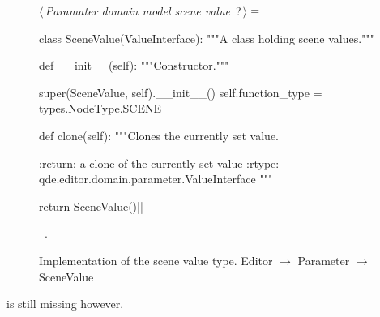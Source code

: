 \documentclass[%
    a4paper,    %
    justified,  %
    nobib,      %
    openany     %
]{tufte-book}
\begin{document}
\begin{figure}
\begin{flushleft} \small
\begin{minipage}{\linewidth}\label{scrap133}\raggedright\small
{} $\langle\,${\itshape Paramater domain model scene value}\nobreak\ {\footnotesize {?}}$\,\rangle\equiv$
\vspace{-1ex}
\begin{pythoncode}
class SceneValue(ValueInterface):
    """A class holding scene values."""

    def __init__(self):
        """Constructor."""

        super(SceneValue, self).__init__()
        self.function_type = types.NodeType.SCENE

    def clone(self):
        """Clones the currently set value.

        :return: a clone of the currently set value
        :rtype:  qde.editor.domain.parameter.ValueInterface
        """

        return SceneValue()|\NWsep|
\end{pythoncode}
\vspace{1.5ex}
\footnotesize
\begin{list}{}{\setlength{\itemsep}{-\parsep}\setlength{\itemindent}{-\leftmargin}}
\item \NWtxtMacroRefIn\ .

\item{}
\end{list}
\end{minipage}\vspace{4ex}
\end{flushleft}
\caption{Implementation of the scene value type.
  \newline{}\newline{}Editor $\rightarrow$ Parameter $\rightarrow$
  SceneValue}
\label{editor:lst:parameter:scene-value}
\end{figure}

 is still missing
however.
\end{document}
